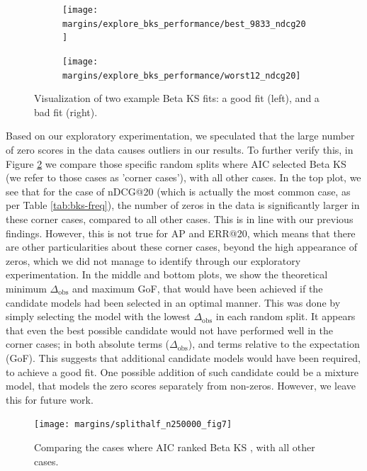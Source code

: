\begin{figure}[t]
	\centering
	\begin{subfigure}{.48\textwidth}
		\centering	\texttt{[image: margins/explore\_bks\_performance/best\_9833\_ndcg20]}
	\end{subfigure}%
	\begin{subfigure}{.48\textwidth}
		\centering
		\texttt{[image: margins/explore\_bks\_performance/worst12\_ndcg20]}
	\end{subfigure}
	\caption{Visualization of two example Beta KS fits: a good fit (left), and a bad fit (right).}
	\label{fig:bks-good-vs-bad}
\end{figure}

Based on our exploratory experimentation, we speculated that the large number of zero scores in the data causes outliers in our results. To further verify this, in Figure \ref{fig:margins-splithalf-plot-7} we compare those specific random splits where AIC selected Beta KS (we refer to those cases as 'corner cases'), with all other cases. In the top plot, we see that for the case of nDCG@20 (which is actually the most common case, as per Table \ref{tab:bks-freq}), the number of zeros in the data is significantly larger in these corner cases, compared to all other cases. This is in line with our previous findings. However, this is not true for AP and ERR@20, which means that there are other particularities about these corner cases, beyond the high appearance of zeros, which we did not manage to identify through our exploratory experimentation. In the middle and bottom plots, we show the theoretical minimum $\Delta_{\text{obs}}$ and maximum GoF, that would have been achieved if the candidate models had been selected in an optimal manner. This was done by simply selecting the model with the lowest $\Delta_{\text{obs}}$ in each random split. It appears that even the best possible candidate would not have performed well in the corner cases; in both absolute terms ($\Delta_{\text{obs}}$), and terms relative to the expectation (GoF). This suggests that additional candidate models would have been required, to achieve a good fit. One possible addition of such candidate could be a mixture model, that models the zero scores separately from non-zeros. However, we leave this for future work. 

\begin{figure}[t]
	\centering	
	\texttt{[image: margins/splithalf\_n250000\_fig7]}
	\caption{Comparing the cases where AIC ranked Beta KS , with all other cases.}
	\label{fig:margins-splithalf-plot-7}
\end{figure}

